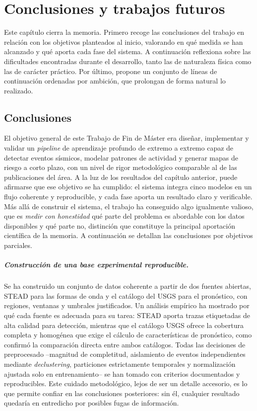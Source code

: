 \cleardoublepage

\chapter{Conclusiones y trabajos futuros}
\label{conclusion-y-trabajos-futuros}

Este capítulo cierra la memoria. Primero recoge las conclusiones del trabajo en relación con
los objetivos planteados al inicio, valorando en qué medida se han alcanzado y qué aporta cada
fase del sistema. A continuación reflexiona sobre las dificultades encontradas durante el
desarrollo, tanto las de naturaleza física como las de carácter práctico. Por último, propone
un conjunto de líneas de continuación ordenadas por ambición, que prolongan de forma natural lo
realizado.

\section{Conclusiones}
\label{conclusiones}

El objetivo general de este Trabajo de Fin de Máster era diseñar, implementar y validar un
\textit{pipeline} de aprendizaje profundo de extremo a extremo capaz de detectar eventos
sísmicos, modelar patrones de actividad y generar mapas de riesgo a corto plazo, con un nivel
de rigor metodológico comparable al de las publicaciones del área. A la luz de los resultados
del capítulo anterior, puede afirmarse que ese objetivo se ha cumplido: el sistema integra
cinco modelos en un flujo coherente y reproducible, y cada fase aporta un resultado claro y
verificable. Más allá de construir el sistema, el trabajo ha conseguido algo igualmente
valioso, que es \emph{medir con honestidad} qué parte del problema es abordable con los datos
disponibles y qué parte no, distinción que constituye la principal aportación científica de la
memoria. A continuación se detallan las conclusiones por objetivos parciales.

\paragraph{Construcción de una base experimental reproducible.} Se ha construido un conjunto
de datos coherente a partir de dos fuentes abiertas, STEAD para las formas de onda y el
catálogo del USGS para el pronóstico, con regiones, ventanas y umbrales justificados. Un
análisis empírico ha mostrado por qué cada fuente es adecuada para su tarea: STEAD aporta
trazas etiquetadas de alta calidad para detección, mientras que el catálogo USGS ofrece la
cobertura completa y homogénea que exige el cálculo de características de pronóstico, como
confirmó la comparación directa entre ambos catálogos. Todas las decisiones de preprocesado
--magnitud de completitud, aislamiento de eventos independientes mediante
\textit{declustering}, particiones estrictamente temporales y normalización ajustada solo en
entrenamiento-- se han tomado con criterios documentados y reproducibles. Este cuidado
metodológico, lejos de ser un detalle accesorio, es lo que permite confiar en las conclusiones
posteriores: sin él, cualquier resultado quedaría en entredicho por posibles fugas de
información.

